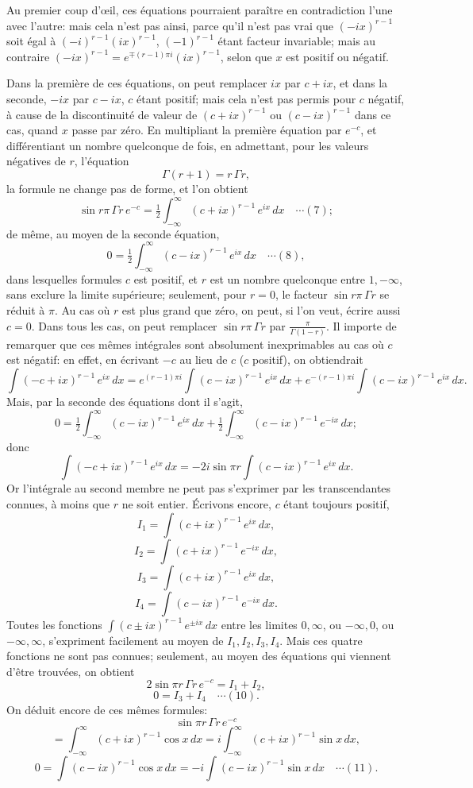 \documentclass[12pt,a4paper]{article}
\begin{document}
Au premier coup d'\oe il, ces \'equations pourraient para\^itre en contradiction l'une avec l'autre: mais cela n'est pas ainsi, parce qu'il n'est pas vrai que $(-ix)^{r-1}$ soit \'egal \`a $(-i)^{r-1}(ix)^{r-1}$, $(-1)^{r-1}$ \'etant facteur invariable; mais au contraire $(-ix)^{r-1} = e^{\mp(r-1)\pi i}(ix)^{r-1}$, selon que $x$ est positif ou n\'egatif.

Dans la premi\`ere de ces \'equations, on peut remplacer $ix$ par $c + ix$, et dans la seconde, $-ix$ par $c - ix$, $c$ \'etant positif; mais cela n'est pas permis pour $c$ n\'egatif, \`a cause de la discontinuit\'e de valeur de $(c + ix)^{r-1}$ ou $(c - ix)^{r-1}$ dans ce cas, quand $x$ passe par z\'ero. En multipliant la premi\`ere \'equation par $e^{-c}$, et diff\'erentiant un nombre quelconque de fois, en admettant, pour les valeurs n\'egatives de $r$, l'\'equation
\[
\Gamma(r + 1) = r\,\Gamma r,
\]
la formule ne change pas de forme, et l'on obtient
\[
\sin r\pi\,\Gamma r\,e^{-c} = \tfrac12\int_{-\infty}^{\infty}(c + ix)^{r-1}\,e^{ix}\,dx \quad\cdots(7);
\]
de m\^eme, au moyen de la seconde \'equation,
\[
0 = \tfrac12\int_{-\infty}^{\infty}(c - ix)^{r-1}\,e^{ix}\,dx \quad\cdots(8),
\]
dans lesquelles formules $c$ est positif, et $r$ est un nombre quelconque entre $1, -\infty$, sans exclure la limite sup\'erieure; seulement, pour $r = 0$, le facteur $\sin r\pi\,\Gamma r$ se r\'eduit \`a $\pi$. Au cas o\`u $r$ est plus grand que z\'ero, on peut, si l'on veut, \'ecrire aussi $c = 0$. Dans tous les cas, on peut remplacer $\sin r\pi\,\Gamma r$ par $\tfrac{\pi}{\Gamma(1 - r)}$. Il importe de remarquer que ces m\^emes int\'egrales sont absolument inexprimables au cas o\`u $c$ est n\'egatif: en effet, en \'ecrivant $-c$ au lieu de $c$ ($c$ positif), on obtiendrait
\[
\int(-c + ix)^{r-1}\,e^{ix}\,dx = e^{(r-1)\pi i}\int(c - ix)^{r-1}\,e^{ix}\,dx + e^{-(r-1)\pi i}\int(c - ix)^{r-1}\,e^{ix}\,dx.
\]
Mais, par la seconde des \'equations dont il s'agit,
\[
0 = \tfrac12\int_{-\infty}^{\infty}(c - ix)^{r-1}\,e^{ix}\,dx + \tfrac12\int_{-\infty}^{\infty}(c - ix)^{r-1}\,e^{-ix}\,dx;
\]
donc
\[
\int(-c + ix)^{r-1}\,e^{ix}\,dx = -2i\sin\pi r\int(c - ix)^{r-1}\,e^{ix}\,dx.
\]
Or l'int\'egrale au second membre ne peut pas s'exprimer par les transcendantes connues, \`a moins que $r$ ne soit entier. \'Ecrivons encore, $c$ \'etant toujours positif,
\[
I_1 = \int(c + ix)^{r-1}\,e^{ix}\,dx,
\]
\[
I_2 = \int(c + ix)^{r-1}\,e^{-ix}\,dx,
\]
\[
I_3 = \int(c + ix)^{r-1}\,e^{ix}\,dx,
\]
\[
I_4 = \int(c - ix)^{r-1}\,e^{-ix}\,dx.
\]
Toutes les fonctions $\int(c \pm ix)^{r-1}\,e^{\pm ix}\,dx$ entre les limites $0, \infty$, ou $-\infty, 0$, ou $-\infty, \infty$, s'expriment facilement au moyen de $I_1, I_2, I_3, I_4$. Mais ces quatre fonctions ne sont pas connues; seulement, au moyen des \'equations qui viennent d'\^etre trouv\'ees, on obtient
\[
2\sin\pi r\,\Gamma r\,e^{-c} = I_1 + I_2,
\]
\[
0 = I_3 + I_4 \quad\cdots(10).
\]
On d\'eduit encore de ces m\^emes formules:
\[
\sin\pi r\,\Gamma r\,e^{-c}
\]
\[
= \int_{-\infty}^{\infty}(c + ix)^{r-1}\cos x\,dx = i\int_{-\infty}^{\infty}(c + ix)^{r-1}\sin x\,dx,
\]
\[
0 = \int(c - ix)^{r-1}\cos x\,dx = -i\int(c - ix)^{r-1}\sin x\,dx \quad\cdots(11).
\]
\end{document}
